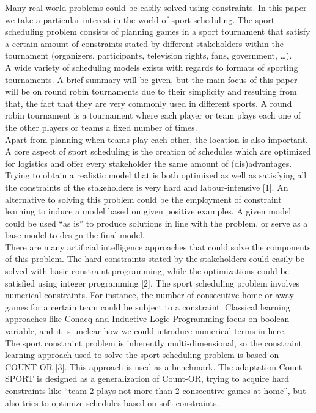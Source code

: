 Many real world problems could be easily solved using constraints. In this paper we take a particular interest in the world of sport scheduling. The sport scheduling problem consists of planning games in a sport tournament that satisfy a certain amount of constraints stated by different stakeholders within the tournament (organizers, participants, television rights, fans, government, …).
\\[5px]
A wide variety of scheduling models exists with regards to formats of sporting tournaments. A brief summary will be given, but the main focus of this paper will be on round robin tournaments due to their simplicity and resulting from that, the fact that they are very commonly used in different sports. A round robin tournament is a tournament where each player or team plays each one of the other players or teams a fixed number of times.
\\[5px]
Apart from planning when teams play each other, the location is also important. A core aspect of sport scheduling is the creation of schedules which are optimized for logistics and offer every stakeholder the same amount of (dis)advantages.
\\[5px]
Trying to obtain a realistic model that is both optimized as well as satisfying all the constraints of the stakeholders is very hard and labour-intensive [1]. An alternative to solving this problem could be the employment of constraint learning to induce a model based on given positive examples. A given model could be used “as is” to produce solutions in line with the problem, or serve as a base model to design the final model.
\\[5px]
There are many artificial intelligence approaches that could solve the components of this problem. The hard constraints stated by the stakeholders could easily be solved with basic constraint programming, while the optimizations could be satisfied using integer programming [2]. The sport scheduling problem involves numerical constraints. For instance, the number of consecutive home or away games for a certain team could be subject to a constraint.  Classical learning approaches like Conacq and Inductive Logic Programming focus on boolean variable, and it -s unclear how we could introduce numerical terms in here.
\\[5px]
The sport constraint problem is inherently multi-dimensional, so the constraint learning approach used to solve the sport scheduling problem is based on COUNT-OR [3]. This approach is used as a benchmark. The adaptation Count-SPORT is designed as a generalization of Count-OR, trying to acquire hard constraints like “team 2 plays not more than 2 consecutive games at home”, but also tries to optimize schedules based on soft constraints.
